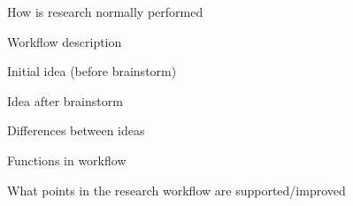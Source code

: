 How is research normally performed

Workflow description

Initial idea (before brainstorm)

Idea after brainstorm

Differences between ideas

Functions in workflow

What points in the research workflow are supported/improved